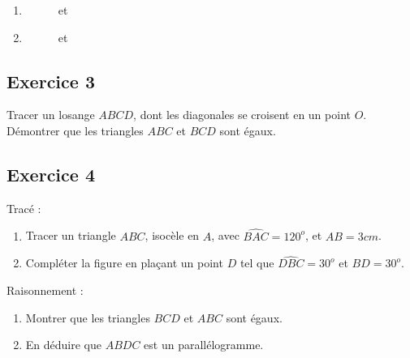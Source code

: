 \documentclass[14 pt]{extarticle}
\theoremstyle{plain}
\begin{document}
\begin{enumerate}
\item
\begin{figure}[H]
\center
 et  \ \ \ \ \ \ \ 
\end{figure}
 \item
\begin{figure}[H]
\center
 et  \ \ \ \ \ \ \ 
\end{figure}
\end{enumerate}

\subsection*{Exercice 3}
 
 Tracer un losange $ABCD$, dont les diagonales se croisent en un point $O$. Démontrer que les triangles $ABC$ et $BCD$ sont égaux. 
 
\subsection*{Exercice 4}
Tracé : 
\begin{enumerate}

\item Tracer un triangle $ABC$, isocèle en $A$, avec $\widehat{BAC}= 120^o$, et $AB= 3 cm$.
\item Compléter la figure en plaçant un point $D$ tel que $\widehat{DBC}= 30^o$ et $BD= 30^o$. 
\end{enumerate}
Raisonnement : 
\begin{enumerate}

\item Montrer que les triangles $BCD$ et $ABC$ sont égaux. 

\item En déduire que $ABDC$ est un parallélogramme. 
\end{enumerate}
 	
\end{document}

